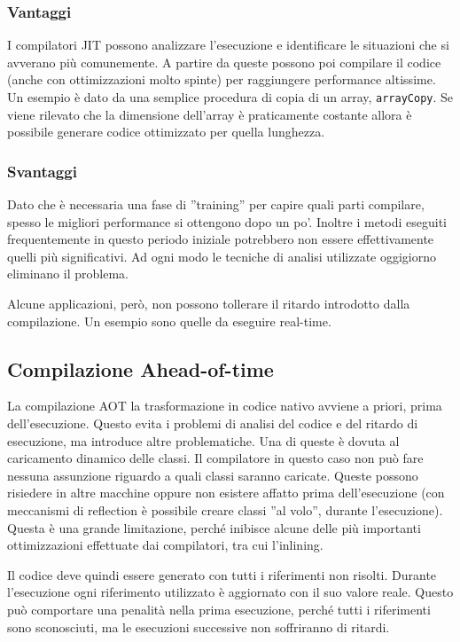 \subsubsection{Vantaggi}
I compilatori JIT possono analizzare l'esecuzione e identificare le situazioni che si avverano più comunemente. A partire da queste possono poi compilare il codice (anche con ottimizzazioni molto spinte) per raggiungere performance altissime. Un esempio è dato da una semplice procedura di copia di un array, \texttt{arrayCopy}. Se viene rilevato che la dimensione dell'array è praticamente costante allora è possibile generare codice ottimizzato per quella lunghezza. 

\subsubsection{Svantaggi}
Dato che è necessaria una fase di ''training'' per capire quali parti compilare, spesso le migliori performance si ottengono dopo un po'. Inoltre i metodi eseguiti frequentemente in questo periodo iniziale potrebbero non essere effettivamente quelli più significativi. Ad ogni modo le tecniche di analisi utilizzate oggigiorno eliminano il problema. 

Alcune applicazioni, però, non possono tollerare il ritardo introdotto dalla compilazione. Un esempio sono quelle da eseguire real-time.

\subsection{Compilazione Ahead-of-time}
La compilazione AOT la trasformazione in codice nativo avviene a priori, prima dell'esecuzione. Questo evita i problemi di analisi del codice e del ritardo di esecuzione, ma introduce altre problematiche. Una di queste è dovuta al caricamento dinamico delle classi. Il compilatore in questo caso non può fare nessuna assunzione riguardo a quali classi saranno caricate. Queste possono risiedere in altre macchine oppure non esistere affatto prima dell'esecuzione (con meccanismi di reflection è possibile creare classi ''al volo'', durante l'esecuzione). Questa è una grande limitazione, perché inibisce alcune delle più importanti ottimizzazioni effettuate dai compilatori, tra cui l'inlining. 

Il codice deve quindi essere generato con tutti i riferimenti non risolti. Durante l'esecuzione ogni riferimento utilizzato è aggiornato con il suo valore reale. Questo può comportare una penalità nella prima esecuzione, perché tutti i riferimenti sono sconosciuti, ma le esecuzioni successive non soffriranno di ritardi.


